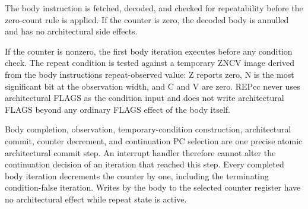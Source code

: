 The body instruction is fetched, decoded, and checked for repeatability before the zero-count rule is applied. If
the counter is zero, the decoded body is annulled and has no architectural side effects.

If the counter is nonzero, the first body iteration executes before any condition check. The repeat condition is
tested against a temporary ZNCV image derived from the body instruction\textquotesingle{}s repeat-observed value: Z reports zero, N is
the most significant bit at the observation width, and C and V are zero. REPcc never uses architectural FLAGS as the
condition input and does not write architectural FLAGS beyond any ordinary FLAGS effect of the body itself.

Body completion, observation, temporary-condition construction, architectural commit, counter decrement, and
continuation PC selection are one precise atomic architectural commit step. An interrupt handler therefore cannot
alter the continuation decision of an iteration that reached this step. Every completed body iteration decrements the
counter by one, including the terminating condition-false iteration. Writes by the body to the selected counter
register have no architectural effect while repeat state is active.
